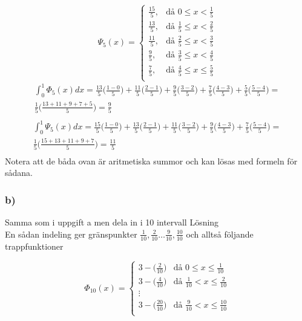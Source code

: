 \documentclass[12pt]{article}
\begin{document}
\[
\Psi_5(x)= \begin{cases} 
	\frac{15}{5}, & \mbox{då } 0 \leq x < \frac{1}{5} \\
	\frac{13}{5}, & \mbox{då } \frac{1}{5} \leq x < \frac{2}{5}\\	
	\frac{11}{5}, & \mbox{då } \frac{2}{5} \le x < \frac{3}{5}\\	
	\frac{9}{5}, &\mbox{då } \frac{3}{5} \leq x < \frac{4}{5}\\	
	\frac{7}{5}, & \mbox{då } \frac{4}{5} \leq x \leq \frac{5}{5}\\	
\end{cases}
\]
\[ 
\begin{split}
 \int_0^1 \Phi_5(x)dx = \frac{13}{5}\Bigg(\frac{1 - 0}{5}\Bigg)+  
 					\frac{11}{5}\Bigg(\frac{2 - 1}{5}\Bigg)+ 
 					\frac{9}{5}\Bigg(\frac{3 - 2}{5}\Bigg)+ 
 					\frac{7}{5}\Bigg(\frac{4 - 3}{5}\Bigg)+ 
 					\frac{5}{5}\Bigg(\frac{5 - 4}{5}\Bigg) = \\
 					\frac{1}{5} \Bigg(\frac{13+11+9+7+5}{5}\Bigg)= \frac{9}{5} \\		
\end{split}
\]
\[
\begin{split}
\int_0^1 \Psi_5(x)dx = \frac{15}{5}\Bigg(\frac{1 - 0}{5}\Bigg)+  
 					\frac{13}{5}\Bigg(\frac{2 - 1}{5}\Bigg)+ 
 					\frac{11}{5}\Bigg(\frac{3 - 2}{5}\Bigg)+ 
 					\frac{9}{5}\Bigg(\frac{4 - 3}{5}\Bigg)+ 
 					\frac{7}{5}\Bigg(\frac{5 - 4}{5}\Bigg) = \\
 					\frac{1}{5} \Bigg(\frac{15+13+11+9+7}{5}\Bigg)= \frac{11}{5} \\		
\end{split}
\]
Notera att de båda ovan är aritmetiska summor och kan lösas med formeln för sådana.

\subsubsection*{b)}
Samma som i uppgift a men dela in i 10 intervall
Lösning \\

En sådan indeling ger gränspunkter $\frac{1}{10}, \frac{2}{10} \ldots \frac{9}{10}, \frac{10}{10}$
och alltså följande trappfunktioner

\[
\Phi_{10} (x)= \begin{cases} 
	3 - \Big(\frac{2}{10}\Big) & \mbox{då }  0 \leq x \leq \frac{1}{10}  \\
	3 - \Big(\frac{4}{10}\Big) & \mbox{då } \frac{1}{10} < x \leq \frac{2}{10}  \\
	\vdots \\
	3 - \Big(\frac{20}{10}\Big) & \mbox{då } \frac{9}{10} < x \leq \frac{10}{10}  \\
\end{cases}
\]
\end{document}
